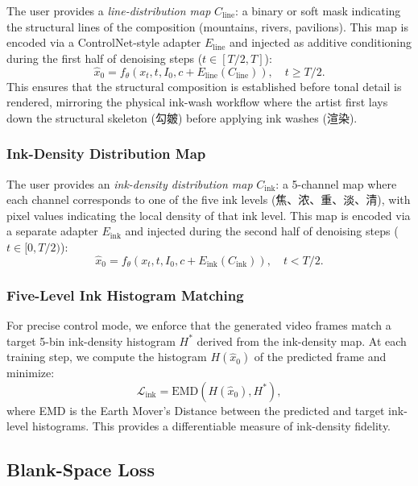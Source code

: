 The user provides a \emph{line-distribution map} $C_{\text{line}}$:
a binary or soft mask indicating the structural lines of the
composition (mountains, rivers, pavilions). This map is encoded
via a ControlNet-style adapter
$E_{\text{line}}$ and injected as additive conditioning during the
first half of denoising steps ($t \in [T/2, T]$):
\begin{equation}
\hat{x}_0 = f_\theta(x_t, t, I_0, c + E_{\text{line}}(C_{\text{line}})),
\quad t \geq T/2.
\end{equation}
This ensures that the structural composition is established before
tonal detail is rendered, mirroring the physical ink-wash workflow
where the artist first lays down the structural skeleton
(勾皴) before applying ink washes (渲染).

\subsubsection{Ink-Density Distribution Map}

The user provides an \emph{ink-density distribution map}
$C_{\text{ink}}$: a 5-channel map where each channel corresponds to
one of the five ink levels
(焦、浓、重、淡、清), with pixel values indicating the local density
of that ink level. This map is encoded via a separate adapter
$E_{\text{ink}}$ and injected during the second half of denoising
steps ($t \in [0, T/2)$):
\begin{equation}
\hat{x}_0 = f_\theta(x_t, t, I_0, c + E_{\text{ink}}(C_{\text{ink}})),
\quad t < T/2.
\end{equation}

\subsubsection{Five-Level Ink Histogram Matching}

For precise control mode, we enforce that the generated video
frames match a target 5-bin ink-density histogram $H^*$ derived
from the ink-density map. At each training step, we compute the
histogram $H(\hat{x}_0)$ of the predicted frame and minimize:
\begin{equation}
\mathcal{L}_{\text{ink}} = \text{EMD}(H(\hat{x}_0), H^*),
\end{equation}
where EMD is the Earth Mover's Distance between the predicted and
target ink-level histograms. This provides a differentiable
measure of ink-density fidelity.

\subsection{Blank-Space Loss}
\label{sec:blank_space}

